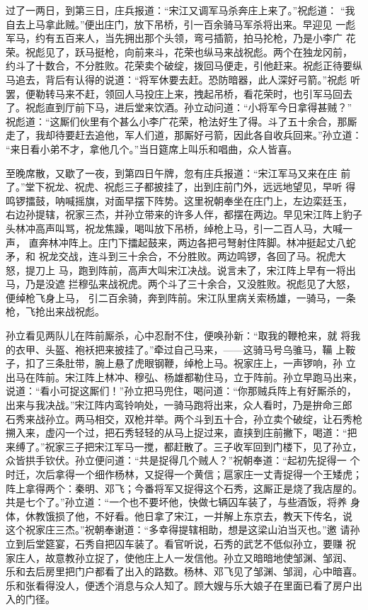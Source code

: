 过了一两日，到第三日，庄兵报道：“宋江又调军马杀奔庄上来了。”祝彪道：
“我自去上马拿此贼。”便出庄门，放下吊桥，引一百余骑马军杀将出来。早迎见
一彪军马，约有五百来人，当先拥出那个头领，弯弓插箭，拍马抡枪，乃是小李广
花荣。祝彪见了，跃马挺枪，向前来斗，花荣也纵马来战祝彪。两个在独龙冈前，
约斗了十数合，不分胜败。花荣卖个破绽，拨回马便走，引他赶来。祝彪正待要纵
马追去，背后有认得的说道：“将军休要去赶。恐防暗器，此人深好弓箭。”祝彪
听罢，便勒转马来不赶，领回人马投庄上来，拽起吊桥，看花荣时，也引军马回去
了。祝彪直到厅前下马，进后堂来饮酒。孙立动问道：“小将军今日拿得甚贼？”
祝彪道：“这厮们伙里有个甚么小李广花荣，枪法好生了得。斗了五十余合，那厮
走了，我却待要赶去追他，军人们道，那厮好弓箭，因此各自收兵回来。”孙立道：
“来日看小弟不才，拿他几个。”当日筵席上叫乐和唱曲，众人皆喜。

至晚席散，又歇了一夜，到第四日午牌，忽有庄兵报道：“宋江军马又来在庄
前了。”堂下祝龙、祝虎、祝彪三子都披挂了，出到庄前门外，远远地望见，早听
得鸣锣擂鼓，呐喊摇旗，对面早摆下阵势。这里祝朝奉坐在庄门上，左边栾廷玉，
右边孙提辖，祝家三杰，并孙立带来的许多人伴，都摆在两边。早见宋江阵上豹子
头林冲高声叫骂，祝龙焦躁，喝叫放下吊桥，绰枪上马，引一二百人马，大喊一声，
直奔林冲阵上。庄门下擂起鼓来，两边各把弓弩射住阵脚。林冲挺起丈八蛇矛，和
祝龙交战，连斗到三十余合，不分胜败。两边鸣锣，各回了马。祝虎大怒，提刀上
马，跑到阵前，高声大叫宋江决战。说言未了，宋江阵上早有一将出马，乃是没遮
拦穆弘来战祝虎。两个斗了三十余合，又没胜败。祝彪见了大怒，便绰枪飞身上马，
引二百余骑，奔到阵前。宋江队里病关索杨雄，一骑马，一条枪，飞抢出来战祝彪。

孙立看见两队儿在阵前厮杀，心中忍耐不住，便唤孙新：“取我的鞭枪来，就
将我的衣甲、头盔、袍袄把来披挂了。”牵过自己马来，——这骑马号乌骓马，鞴
上鞍子，扣了三条肚带，腕上悬了虎眼钢鞭，绰枪上马。祝家庄上，一声锣响，孙
立出马在阵前。宋江阵上林冲、穆弘、杨雄都勒住马，立于阵前。孙立早跑马出来，
说道：“看小可捉这厮们！”孙立把马兜住，喝问道：“你那贼兵阵上有好厮杀的，
出来与我决战。”宋江阵内鸾铃响处，一骑马跑将出来，众人看时，乃是拚命三郎
石秀来战孙立。两马相交，双枪并举。两个斗到五十合，孙立卖个破绽，让石秀枪
搠入来，虚闪一个过，把石秀轻轻的从马上捉过来，直挟到庄前撇下，喝道：“把
来缚了。”祝家三子把宋江军马一搅，都赶散了。三子收军回到门楼下，见了孙立，
众皆拱手钦伏。孙立便问道：“共是捉得几个贼人？”祝朝奉道：“起初先捉得一
个时迁，次后拿得一个细作杨林，又捉得一个黄信；扈家庄一丈青捉得一个王矮虎；
阵上拿得两个：秦明、邓飞；今番将军又捉得这个石秀，这厮正是烧了我店屋的。
共是七个了。”孙立道：“一个也不要坏他，快做七辆囚车装了，与些酒饭，将养
身体，休教饿损了他，不好看。他日拿了宋江，一并解上东京去，教天下传名，说
这个祝家庄三杰。”祝朝奉谢道：“多幸得提辖相助，想是这梁山泊当灭也。”邀
请孙立到后堂筵宴，石秀自把囚车装了。看官听说，石秀的武艺不低似孙立，要赚
祝家庄人，故意教孙立捉了，使他庄上人一发信他。孙立又暗暗地使邹渊、邹润、
乐和去后房里把门户都看了出入的路数。杨林、邓飞见了邹渊、邹润，心中暗喜。
乐和张看得没人，便透个消息与众人知了。顾大嫂与乐大娘子在里面已看了房户出
入的门径。

